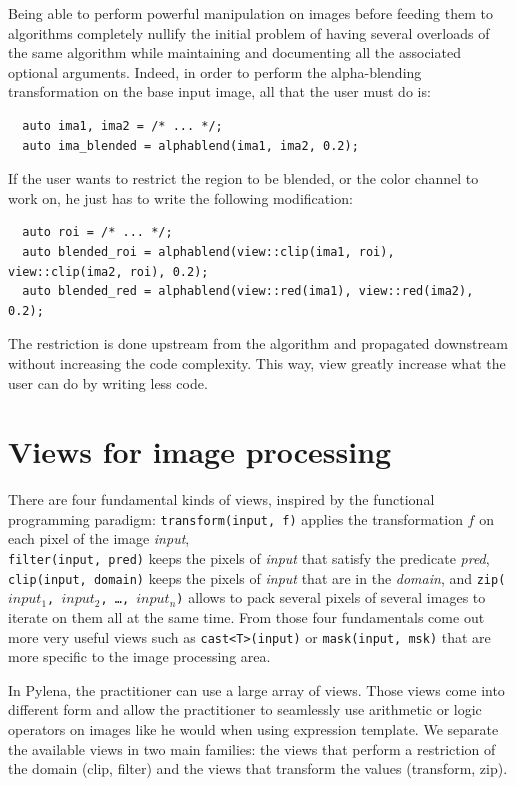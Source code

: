 Being able to perform powerful manipulation on images before feeding them to algorithms completely nullify the initial
problem of having several overloads of the same algorithm while maintaining and documenting all the associated optional
arguments. Indeed, in order to perform the alpha-blending transformation on the base input image, all that the user must
do is:
\begin{verbatim}
  auto ima1, ima2 = /* ... */;
  auto ima_blended = alphablend(ima1, ima2, 0.2);
\end{verbatim}
If the user wants to restrict the region to be blended, or the color channel to work on, he just has to write the
following modification:
\begin{verbatim}
  auto roi = /* ... */;
  auto blended_roi = alphablend(view::clip(ima1, roi), view::clip(ima2, roi), 0.2);
  auto blended_red = alphablend(view::red(ima1), view::red(ima2), 0.2);
\end{verbatim}
The restriction is done upstream from the algorithm and propagated downstream without increasing the code complexity.
This way, view greatly increase what the user can do by writing less code.

\section{Views for image processing}
\label{sec:viws_for_ip}

There are four fundamental kinds of views, inspired by the functional programming paradigm: \texttt{transform(input, f)}
applies the transformation \(f\) on each pixel of the image \emph{input},\\
\texttt{filter(input, pred)} keeps the pixels of \emph{input} that satisfy the predicate \emph{pred},
\texttt{clip(input, domain)} keeps the pixels of \emph{input} that are in the \emph{domain}, and
\texttt{zip(\(input_1\), \(input_2\), \ldots, \(input_n\))} allows to pack several pixels of several images to iterate
on them all at the same time. From those four fundamentals come out more very useful views such as
\texttt{cast<T>(input)} or \texttt{mask(input, msk)} that are more specific to the image processing area.

In Pylena, the practitioner can use a large array of views. Those views come into different form and allow the
practitioner to seamlessly use arithmetic or logic operators on images like he would when using expression template. We
separate the available views in two main families: the views that perform a restriction of the domain (clip, filter) and
the views that transform the values (transform, zip).

